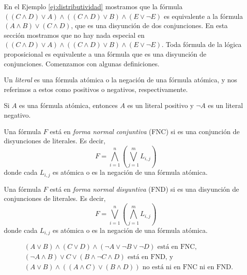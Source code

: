 \message{ !name(main.tex)}\documentclass[12pt,a4paper]{book}
\begin{document}
    En el Ejemplo \ref{ej:distributividad} mostramos que la fórmula $((C\wedge D)\vee A)\wedge((C\wedge D)\vee B)\wedge(E\vee\neg E)$
    es equivalente a la fórmula $(A\wedge B)\vee(C\wedge D)$, que es una disyunción de dos conjunciones. En esta sección
    mostramos que no hay nada especial en $((C\wedge D)\vee A)\wedge((C\wedge D)\vee B)\wedge(E\vee\neg E)$. Toda fórmula de la
    lógica proposicional es equivalente a una fórmula que es una disyunción de conjunciones. Comenzamos con algunas
    definiciones.

    \begin{definicion}[Literal]\label{def:literal}
        Un \textit{literal} es una fórmula atómica o la negación de una fórmula atómica, y nos referimos a estos como
        positivos o negativos, respectivamente.
    \end{definicion}

    \begin{ejemplo}
        Si $A$ es una fórmula atómica, entonces $A$ es un literal positivo y $\neg A$ es un literal negativo.
    \end{ejemplo}

    \begin{definicion}\label{def:fnc}
        Una fórmula $F$ está en \textit{forma normal conjuntiva} (FNC) si es una conjunción de disyunciones de literales. Es
        decir,
        \begin{equation*}
            F=\bigwedge_{i=1}^{n}\left(\bigvee_{j=1}^{m}L_{i,j}\right)
        \end{equation*}
        donde cada $L_{i,j}$ es atómica o es la negación de una fórmula atómica.
    \end{definicion}

    \begin{definicion}\label{def:fnd}
        Una fórmula $F$ está en \textit{forma normal disyuntiva} (FND) si es una disyunción de conjunciones de literales. Es
        decir,
        \begin{equation*}
            F=\bigvee_{i=1}^{n}\left(\bigwedge_{j=1}^{m}L_{i,j}\right)
        \end{equation*}
        donde cada $L_{i,j}$ es atómica o es la negación de una fórmula atómica.
    \end{definicion}

    \begin{ejemplo}\label{ej:fnc-fnd-ejemplos}
        \begin{align*}
            &(A\vee B)\wedge(C\vee D)\wedge(\neg A\vee\neg B\vee\neg D)\text{ está en FNC,}\\
            &(\neg A\wedge B)\vee C\vee(B\wedge\neg C\wedge D)\text{ está en FND, y}\\
            &(A\vee B)\wedge((A\wedge C)\vee(B\wedge D))\text{ no está ni en FNC ni en FND.}
        \end{align*}
    \end{ejemplo}
\end{document}
